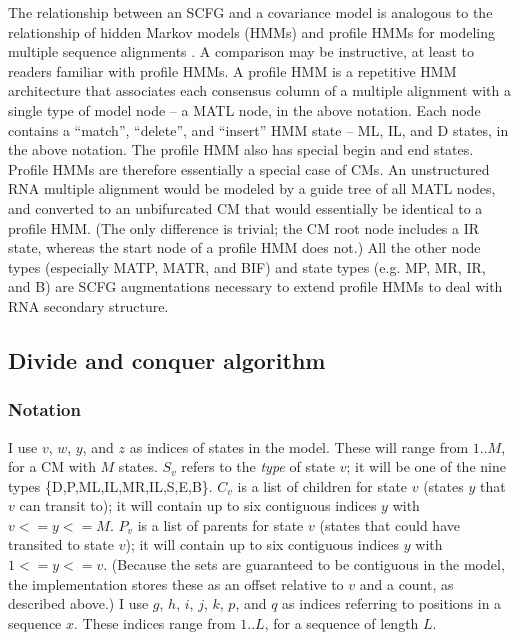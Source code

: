 \documentclass[11pt]{article}
\begin{document}
The relationship between an SCFG and a covariance model is analogous
to the relationship of hidden Markov models (HMMs) and profile HMMs
for modeling multiple sequence alignments
\cite{Krogh94,Durbin98,Eddy98}. A comparison may be instructive, at
least to readers familiar with profile HMMs.  A profile HMM is a
repetitive HMM architecture that associates each consensus column of a
multiple alignment with a single type of model node -- a MATL node, in
the above notation. Each node contains a ``match'', ``delete'', and
``insert'' HMM state -- ML, IL, and D states, in the above notation.
The profile HMM also has special begin and end states. Profile HMMs
are therefore essentially a special case of CMs. An unstructured RNA
multiple alignment would be modeled by a guide tree of all MATL nodes,
and converted to an unbifurcated CM that would essentially be
identical to a profile HMM. (The only difference is trivial; the CM
root node includes a IR state, whereas the start node of a profile HMM
does not.) All the other node types (especially MATP, MATR, and BIF)
and state types (e.g. MP, MR, IR, and B) are SCFG augmentations
necessary to extend profile HMMs to deal with RNA secondary structure.



\subsection{Divide and conquer algorithm}

\subsubsection{Notation}

I use $v$, $w$, $y$, and $z$ as indices of states in the model. These
will range from $1..M$, for a CM with $M$ states. $S_v$ refers to the
\emph{type} of state $v$; it will be one of the nine types
\{D,P,ML,IL,MR,IL,S,E,B\}. $C_v$ is a list of children for state $v$
(states $y$ that $v$ can transit to); it will contain up to six
contiguous indices $y$ with $v <= y <= M$. $P_v$ is a list of parents
for state $v$ (states that could have transited to state $v$); it will
contain up to six contiguous indices $y$ with $1 <= y <= v$. (Because
the sets are guaranteed to be contiguous in the model, the
implementation stores these as an offset relative to $v$ and a count,
as described above.) I use $g$, $h$, $i$, $j$, $k$, $p$, and $q$ as
indices referring to positions in a sequence $x$. These indices range
from $1..L$, for a sequence of length $L$.
\end{document}
